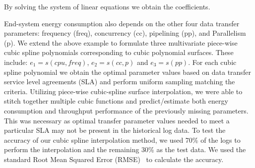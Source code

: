 \documentclass[conference]{IEEEtran}
\begin{document}
By solving the system of linear equations we obtain the coefficients.\par 
End-system energy consumption also depends on the other four data transfer parameters: frequency (freq), concurrency (cc), pipelining (pp), and Parallelism (p). We extend the above example to formulate three multivariate piece-wise cubic spline polynomials corresponding to cubic polynomial surfaces. These include: $e_1=s(cpu,freq)$, $e_2=s(cc,p)$ and $e_3=s(pp)$. For each cubic spline polynomial we obtain the optimal parameter values based on data transfer service level agreements (SLA) and perform uniform sampling matching the criteria. 
Utilizing piece-wise cubic-spline surface interpolation, we were able to stitch together multiple cubic functions and predict/estimate both energy consumption and throughput performance of the previously missing parameters. This was necessary as optimal transfer parameter values needed to meet a particular SLA may not be present in the historical log data. To test the accuracy of our cubic spline interpolation method, we used 70\% of the logs to perform the interpolation and the remaining 30\% as the test data. We used the standard Root Mean Squared Error (RMSE)~\cite{wiener1949wiener} to calculate the accuracy.  %
\end{document}
